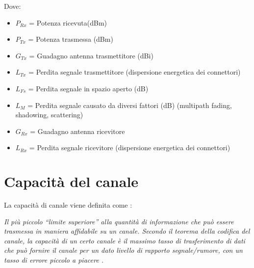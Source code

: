 \documentclass[12pt,a4paper,openright,twoside]{report}
\begin{document}
Dove:
\begin{itemize} 
\item $P_{Rx}$ = Potenza ricevuta(dBm)
\item $P_{Tx}$ = Potenza trasmessa (dBm)
\item $G_{Tx}$ = Guadagno antenna trasmettitore (dBi)
\item $L_{Tx}$ = Perdita segnale trasmettitore (dispersione energetica dei connettori)
\item $L_{Fs}$ = Perdita segnale in spazio aperto (dB)
\item $L_{M}$ = Perdita segnale causato da diversi fattori (dB) (multipath fading, shadowing, scattering)
\item $ G_{Rx}$ = Guadagno antenna ricevitore
\item $ L_{Rx}$ = Perdita segnale ricevitore (dispersione energetica dei connettori)
\end{itemize}

\section{Capacit\`a del canale}
La capacit\`a di canale viene definita come :

\itshape
Il pi\`u piccolo ``limite superiore'' alla quantit\`a di informazione che pu\`o essere trasmessa in maniera affidabile su un canale. Secondo il teorema della codifica del canale, la capacit\`a di un certo canale \`e il massimo tasso di trasferimento di dati che pu\`o fornire il canale per un dato livello di rapporto segnale/rumore, con un tasso di errore piccolo a piacere \cite{K1}.
\end{document}
